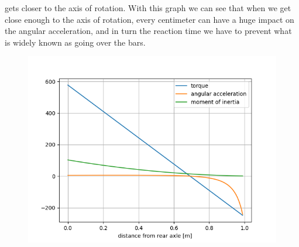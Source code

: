 \documentclass[12pt]{article}
\begin{document}
gets closer to the axis of rotation. With this graph we can see that when we get close enough to the axis of 
rotation, every centimeter can have a huge impact on the angular acceleration, and in turn the reaction time 
we have to prevent what is widely known as going over the bars.
\begin{figure}[H]
\caption{}
\centering%
\label{fig:angular_acceleration_graph}
\includegraphics[width=0.8\linewidth]{angular_acceleration}%
\end{figure}
\end{document}
